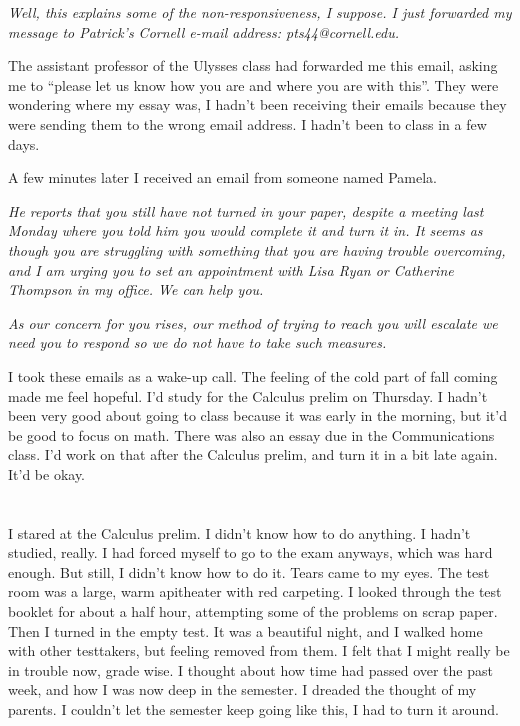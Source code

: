 \textit{Well, this explains some of the non-responsiveness, I suppose.  I just
forwarded my message to Patrick's Cornell e-mail address:  pts44@cornell.edu.}


The assistant professor of the Ulysses class had forwarded me this email, asking
me to ``please let us know how you are and where you are with this''.  They were
wondering where my essay was, I hadn't been receiving their emails because they
were sending them to the wrong email address.  I hadn't been to class in a few
days.

A few minutes later I received an email from someone named Pamela.

\textit{
He reports that you still have not turned in your paper, despite a meeting last
Monday where you told him you would complete it and turn it in.  It seems as
though you are struggling with something that you are having trouble
overcoming, and I am urging you to set an appointment with Lisa Ryan or
Catherine Thompson in my office.  We can help you. }

\textit{
As our concern for you rises, our method of trying to reach you will escalate 
we need you to respond so we do not have to take such measures.}



I took these emails as a wake-up call.  The feeling of the cold part of fall
coming made me feel hopeful.  I'd study for the Calculus prelim on Thursday.  I
hadn't been very good about going to class because it was early in the morning,
but it'd be good to focus on math.  There was also an essay due in the
Communications class.  I'd work on that after the Calculus prelim, and turn it
in a bit late again.  It'd be okay.

\section{}

I stared at the Calculus prelim.  I didn't know how to do anything.  I hadn't
studied, really. I had forced myself to go to the exam anyways, which was hard
enough.  But still, I didn't know how to do it.  Tears came to my eyes.  The
test room was a large, warm apitheater with red carpeting. I looked through the
test booklet for about a half hour, attempting some of the problems on scrap
paper.    Then I turned in the empty test.  It was a beautiful night, and I
walked home with other testtakers, but feeling removed from them.  I felt that I
might really be in trouble now, grade wise.  I thought about how time had passed
over the past week, and how I was now deep in the semester.  I dreaded the
thought of my parents.  I couldn't let the semester keep going like this, I had
to turn it around.

